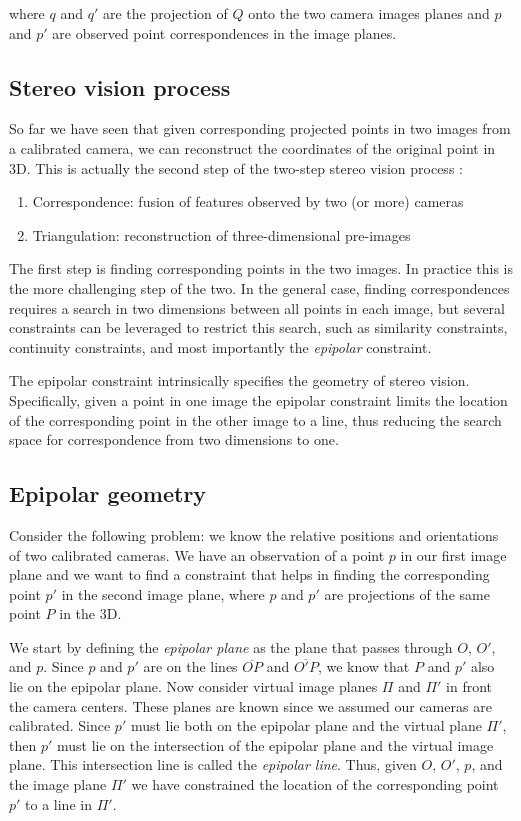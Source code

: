 \documentclass[twoside]{article}
\begin{document}
where $q$ and $q'$ are the projection of $Q$ onto the two camera images planes and $p$ and $p'$ are observed point correspondences in the image planes.

\subsection{Stereo vision process}

So far we have seen that given corresponding projected points in two images from a calibrated camera, we can reconstruct the coordinates of the original point in 3D. This is actually the second step of the two-step stereo vision process :

\begin{enumerate}
  \item Correspondence: fusion of features observed by two (or more) cameras
  \item Triangulation: reconstruction of three-dimensional pre-images
\end{enumerate}

The first step is finding corresponding points in the two images. In practice this is the more challenging step of the two. In the general case, finding correspondences requires a search in two dimensions between all points in each image, but several constraints can be leveraged to restrict this search, such as similarity constraints, continuity constraints, and most importantly the \emph{epipolar} constraint.

The epipolar constraint intrinsically specifies the geometry of stereo vision. Specifically, given a point in one image the epipolar constraint limits the location of the corresponding point in the other image to a line, thus reducing the search space for correspondence from two dimensions to one.

\subsection{Epipolar geometry}

Consider the following problem: we know the relative positions and orientations of two calibrated cameras. We have an observation of a point $p$ in our first image plane and we want to find a constraint that helps in finding the corresponding point $p'$ in the second image plane, where $p$ and $p'$ are projections of the same point $P$ in the 3D.

We start by defining the \emph{epipolar plane} as the plane that passes through $O$, $O'$, and $p$. Since $p$ and $p'$ are on the lines $\overline{OP}$ and $\overline{O'P}$, we know that $P$ and $p'$ also lie on the epipolar plane. Now consider virtual image planes $\Pi$ and $\Pi'$ in front the camera centers. These planes are known since we assumed our cameras are calibrated. Since $p'$ must lie both on the epipolar plane and the virtual plane $\Pi'$, then $p'$ must lie on the intersection of the epipolar plane and the virtual image plane. This intersection line is called the \emph{epipolar line}. Thus, given $O$, $O'$, $p$, and the image plane $\Pi'$ we have constrained the location of the corresponding point $p'$ to a line in $\Pi'$.
\end{document}
